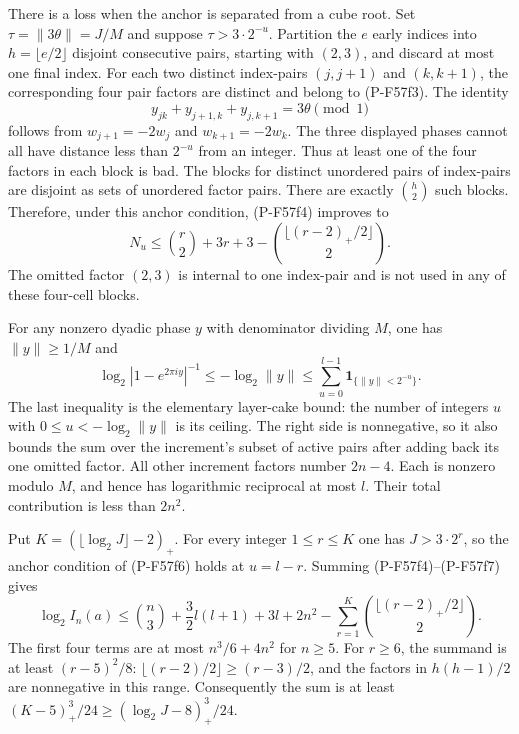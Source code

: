 There is a loss when the anchor is separated from a cube
root. Set $\tau=\|3\theta\|=J/M$ and suppose
$\tau>3\cdot2^{-u}$.
Partition the $e$ early indices into
$h=\lfloor e/2\rfloor$ disjoint consecutive pairs,
starting with $(2,3)$, and discard at most one final index.
For each two distinct index-pairs $(j,j+1)$ and $(k,k+1)$,
the corresponding four pair factors are distinct and
belong to (P-F57f3). The identity
\[
          y_{jk}+y_{j+1,k}+y_{j,k+1}=3\theta
                                      \pmod1
 \tag{P-F57f5}
\]
follows from $w_{j+1}=-2w_j$ and $w_{k+1}=-2w_k$.
The three displayed phases cannot all have distance
less than $2^{-u}$ from an integer. Thus at least one
of the four factors in each block is bad.
The blocks for distinct unordered pairs of index-pairs
are disjoint as sets of unordered factor pairs.
There are exactly $\binom h2$ such blocks. Therefore,
under this anchor condition, (P-F57f4) improves to
\[
       N_u\le\binom r2+3r+3
              -\binom{\lfloor(r-2)_+/2\rfloor}{2}.
 \tag{P-F57f6}
\]
The omitted factor $(2,3)$ is internal to one index-pair
and is not used in any of these four-cell blocks.

For any nonzero dyadic phase $y$ with denominator dividing
$M$, one has $\|y\|\ge1/M$ and
\[
 \log_2|1-e^{2\pi iy}|^{-1}
 \le-\log_2\|y\|
 \le\sum_{u=0}^{l-1}\mathbf1_{\{\|y\|<2^{-u}\}}.
 \tag{P-F57f7}
\]
The last inequality is the elementary layer-cake bound:
the number of integers $u$ with $0\le u< -\log_2\|y\|$
is its ceiling. The right side is nonnegative, so it
also bounds the sum over the increment's subset of active
pairs after adding back its one omitted factor.
All other increment factors number $2n-4$.
Each is nonzero modulo $M$, and hence has logarithmic
reciprocal at most $l$. Their total contribution is
less than $2n^2$.

Put $K=(\lfloor\log_2J\rfloor-2)_+$.
For every integer $1\le r\le K$ one has
$J>3\cdot2^r$, so the anchor condition of (P-F57f6)
holds at $u=l-r$.
Summing (P-F57f4)--(P-F57f7) gives
\[
 \log_2 I_n(a)
 \le\binom n3+\frac32l(l+1)+3l+2n^2
       -\sum_{r=1}^K
                  \binom{\lfloor(r-2)_+/2\rfloor}{2}.
 \tag{P-F57f8}
\]
The first four terms are at most $n^3/6+4n^2$ for $n\ge5$.
For $r\ge6$, the summand is at least $(r-5)^2/8$:
$\lfloor(r-2)/2\rfloor\ge(r-3)/2$, and the factors
in $h(h-1)/2$ are nonnegative in this range.
Consequently the sum is at least
$(K-5)_+^3/24\ge(\log_2J-8)_+^3/24$.

